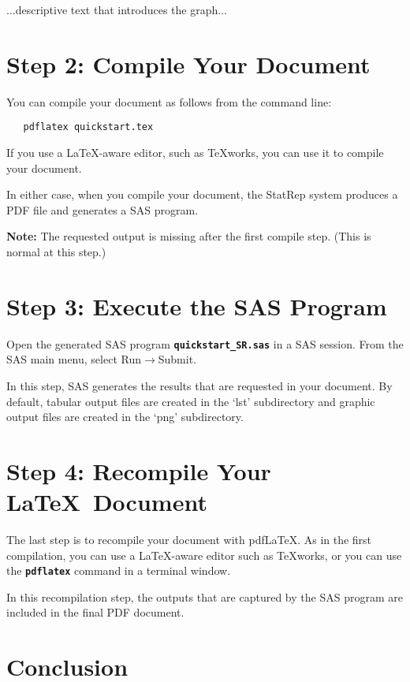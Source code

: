 \documentclass{article}
\newcommand*{\Statrep}{\mbox{\textsf{StatRep}}\xspace}
\newcommand*{\Code}[1]{\texttt{\textbf{#1}}}
\begin{document}
...descriptive text that introduces the graph...



\section{Step 2: Compile Your Document}

You can compile your document as follows from the command line:
\begin{verbatim}
   pdflatex quickstart.tex
\end{verbatim}

If you use a \LaTeX-aware editor, such as \TeX works, you can use it to
compile your document.

In either case, when you compile your document, the
\Statrep system produces a PDF file and generates a SAS program.

\textbf{Note:} The requested output is missing after the first compile step.
(This is normal at this step.)

\section{Step 3: Execute the SAS Program}

Open the generated SAS program \Code{quickstart\_SR.sas} in a
SAS session. From the SAS main menu, select
\textsf{Run}$\rightarrow$\textsf{Submit}.

In this step, SAS generates the results that are requested in your document.
By default, tabular output files are created in the `lst' subdirectory and
graphic output files are created in the `png' subdirectory.

\section{Step 4: Recompile Your \LaTeX\ Document}

The last step is to recompile your document with pdf\LaTeX.
As in the first compilation, you can use a \LaTeX-aware editor such
as \TeX works, or you can use the \Code{pdflatex} command in a terminal window.

In this recompilation step, the outputs that are captured by the SAS program
are included in the final PDF document.

\section{Conclusion}
\end{document}
